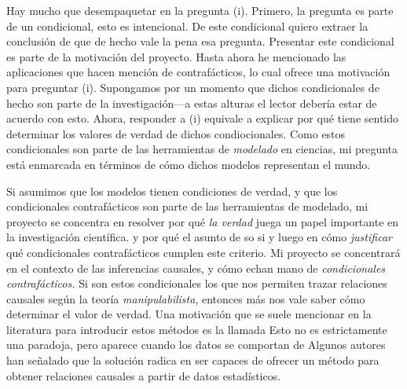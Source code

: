 {Hay mucho que desempaquetar en la pregunta (i). Primero, la
pregunta es parte de un condicional, esto es intencional. De
este condicional quiero extraer la conclusión de que de
hecho vale la pena esa pregunta. Presentar este condicional
es parte de la motivación del proyecto. Hasta ahora he
mencionado las aplicaciones que hacen mención de
contrafácticos, lo cual ofrece una motivación para preguntar
(i). Supongamos por un momento que dichos condicionales de
hecho son parte de la investigación---a estas alturas el
lector debería estar de acuerdo con esto. Ahora, responder a
(i) equivale a explicar por qué tiene sentido determinar los
valores de verdad de dichos condiocionales. Como estos
condicionales son parte de las herramientas de
\emph{modelado} en ciencias, mi pregunta está enmarcada en
términos de cómo dichos modelos representan el mundo.

Si asumimos que los modelos tienen condiciones de verdad, y
que los condicionales contrafácticos son parte de las
herramientas de modelado, mi proyecto se concentra en
resolver por qué \emph{la verdad} juega un papel importante
en la investigación científica.  y por qué el asunto de so
si  y luego en cómo \emph{justificar} qué condicionales
contrafácticos cumplen este criterio. Mi proyecto se
concentrará en el contexto de las inferencias causales, y
cómo echan mano de \emph{condicionales contrafácticos.} Si
son estos condicionales los que nos permiten trazar
relaciones causales según la teoría \emph{manipulabilista},
entonces más nos vale saber cómo determinar el valor de
verdad. Una motivación que se suele mencionar en la
literatura para introducir estos métodos es la llamada
 Esto no es estrictamente una
paradoja, pero aparece cuando los datos se comportan de
Algunos autores han señalado que la solución radica en ser
capaces de ofrecer un método para obtener relaciones
causales a partir de datos estadísticos.

}
